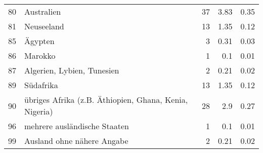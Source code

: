 \begin{longtable}{lXrrr}
        80 & \multicolumn{1}{X}{Australien} & %
          \num{37} &
          \num[round-mode=places,round-precision=2]{3.83} &
          \num[round-mode=places,round-precision=2]{0.35} \\

        81 & \multicolumn{1}{X}{Neuseeland} & %
          \num{13} &
          \num[round-mode=places,round-precision=2]{1.35} &
          \num[round-mode=places,round-precision=2]{0.12} \\

        85 & \multicolumn{1}{X}{Ägypten} & %
          \num{3} &
          \num[round-mode=places,round-precision=2]{0.31} &
          \num[round-mode=places,round-precision=2]{0.03} \\

        86 & \multicolumn{1}{X}{Marokko} & %
          \num{1} &
          \num[round-mode=places,round-precision=2]{0.1} &
          \num[round-mode=places,round-precision=2]{0.01} \\

        87 & \multicolumn{1}{X}{Algerien, Lybien, Tunesien} & %
          \num{2} &
          \num[round-mode=places,round-precision=2]{0.21} &
          \num[round-mode=places,round-precision=2]{0.02} \\

        89 & \multicolumn{1}{X}{Südafrika} & %
          \num{13} &
          \num[round-mode=places,round-precision=2]{1.35} &
          \num[round-mode=places,round-precision=2]{0.12} \\

        90 & \multicolumn{1}{X}{übriges Afrika (z.B. Äthiopien, Ghana, Kenia, Nigeria)} & %
          \num{28} &
          \num[round-mode=places,round-precision=2]{2.9} &
          \num[round-mode=places,round-precision=2]{0.27} \\

        96 & \multicolumn{1}{X}{mehrere ausländische Staaten} & %
          \num{1} &
          \num[round-mode=places,round-precision=2]{0.1} &
          \num[round-mode=places,round-precision=2]{0.01} \\

        99 & \multicolumn{1}{X}{Ausland ohne nähere Angabe} & %
          \num{2} &
          \num[round-mode=places,round-precision=2]{0.21} &
          \num[round-mode=places,round-precision=2]{0.02} \\


\end{longtable}
